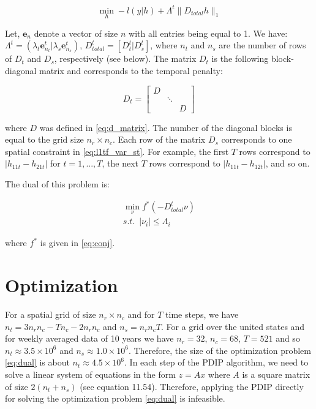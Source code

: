 \documentclass{article}
\begin{document}
\begin{equation}
\min_h -l(y|h)+ \Lambda^t \lVert D_{total}h \lVert_1
\label{eq:l1tf_var_st_mat}
\end{equation}

Let, $\textbf{e}_n$ denote a vector of size $n$ with all entries being equal to 1. We have: $\Lambda^t=(\lambda_t\textbf{e}_{n_t}^t|\lambda_s\textbf{e}_{n_s}^t)$, $D_{total}^t=[D_{t}^t|D_{s}^t]$, where $n_t$ and $n_s$ are the number of rows of $D_{t}$ and $D_{s}$, respectively (see below). The matrix $D_t$ is the following block-diagonal matrix and corresponds to the temporal penalty:

\begin{equation}
D_t=\begin{bmatrix}
D &  & \\ 
 & \ddots & \\
 &  & D
\end{bmatrix}
\label{eq:d_t_matrix}
\end{equation}

 where $D$ was defined in \eqref{eq:d_matrix}. The number of the diagonal blocks is equal to the grid size $n_r \times n_c$. Each row of the matrix $D_s$ corresponds to one spatial constraint in \eqref{eq:l1tf_var_st}. For example, the first $T$ rows correspond to $|h_{11t}-h_{21t}|$ for $t=1,...,T$, the next $T$ rows correspond to $|h_{11t}-h_{12t}|$, and so on.

The dual of this problem is:

\begin{equation}
\begin{aligned}
\min_\nu f^*(-D_{total}^t\mathsf{\nu}) \\
s.t. \,\,\, | \nu_i | \le \Lambda_i
\end{aligned}
\label{eq:dual}
\end{equation}

 where $f^*$ is given in \eqref{eq:conj}.


\section{Optimization}
For a spatial grid of size $n_r \times n_c$ and for $T$ time steps, we have $n_t=3n_rn_c-Tn_c-2n_rn_c$ and $n_s=n_rn_cT$. For a grid over the united states and for weekly averaged data of 10 years we have $n_r=32$, $n_c=68$, $T=521$ and so $n_t\approx 3.5\times10^6$ and $n_s \approx 1.0\times10^6$. Therefore, the size of the optimization problem \eqref{eq:dual} is about $n_t\approx 4.5\times10^6$. In each step of the PDIP algorithm, we need to solve a linear system of equations in the form $z=Ax$ where $A$ is a square matrix of size $2(n_t+n_s)$ (see \citep{boyd_convex_2004} equation 11.54). Therefore, applying the PDIP directly for solving the optimization problem \eqref{eq:dual} is infeasible.
\end{document}
